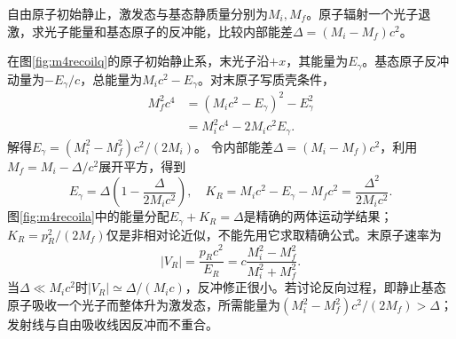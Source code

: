 \begin{example}\label{ex:m4photonrecoil}
自由原子初始静止，激发态与基态静质量分别为$M_i,M_f$。原子辐射一个光子退激，求光子能量和基态原子的反冲能，比较内部能差$\Delta=(M_i-M_f)c^2$。
\end{example}
\begin{solution}
在图\ref{fig:m4recoilq}的原子初始静止系，末光子沿$+x$，其能量为$E_\gamma$。基态原子反冲动量为$-E_\gamma/c$，总能量为$M_ic^2-E_\gamma$。对末原子写质壳条件，
\begin{align*}
 M_f^2c^4&=(M_ic^2-E_\gamma)^2-E_\gamma^2\\
 &=M_i^2c^4-2M_ic^2E_\gamma.
\end{align*}
解得$E_\gamma=(M_i^2-M_f^2)c^2/(2M_i)$。
令内部能差$\Delta=(M_i-M_f)c^2$，利用$M_f=M_i-\Delta/c^2$展开平方，得到
\[
 E_\gamma=\Delta\left(1-\frac{\Delta}{2M_ic^2}\right),\quad
 K_R=M_ic^2-E_\gamma-M_fc^2=\frac{\Delta^2}{2M_ic^2}.
\]
图\ref{fig:m4recoila}中的能量分配$E_\gamma+K_R=\Delta$是精确的两体运动学结果；$K_R=p_R^2/(2M_f)$仅是非相对论近似，不能先用它求取精确公式。末原子速率为
\[
 |V_R|=\frac{p_Rc^2}{E_R}
 =c\frac{M_i^2-M_f^2}{M_i^2+M_f^2}.
\]
当$\Delta\ll M_ic^2$时$|V_R|\simeq\Delta/(M_ic)$，反冲修正很小。若讨论反向过程，即静止基态原子吸收一个光子而整体升为激发态，所需能量为$(M_i^2-M_f^2)c^2/(2M_f)>\Delta$；发射线与自由吸收线因反冲而不重合。
\end{solution}
